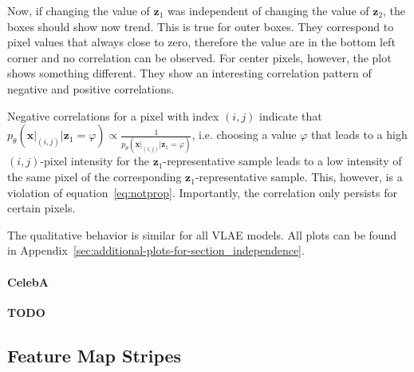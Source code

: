 Now, if changing the value of $\bm{z}_1$ was independent of changing the value of $\bm{z}_2$, the boxes should show now trend.
This is true for outer boxes.
They correspond to pixel values that always close to zero, therefore the value are in the bottom left corner and no correlation can be observed.
For center pixels, however, the plot shows something different.
They show an interesting correlation pattern of negative and positive correlations.

Negative correlations for a pixel with index $(i,j)$ indicate that $p_\theta(\bm{x}\big|_{(i,j)} | \bm{z}_1 = \varphi) \propto \frac{1}{p_\theta(\bm{x}\big|_{(i,j)} | \bm{z}_1 = \varphi)}$, i.e. choosing a value $\varphi$ that leads to a high $(i,j)$-pixel intensity for the $\bm{z}_1$-representative sample leads to a low intensity of the same pixel of the corresponding $\bm{z}_1$-representative sample.
This, however, is a violation of equation~\ref{eq:notprop}.
Importantly, the correlation only persists for certain pixels.

The qualitative behavior is similar for all \ac{VLAE} models.
All plots can be found in Appendix~\ref{sec:additional-plots-for-section_independence}.

\paragraph{CelebA}

\textbf{TODO}



\subsection{Feature Map Stripes}\label{subsec:feature-map-stripes}

